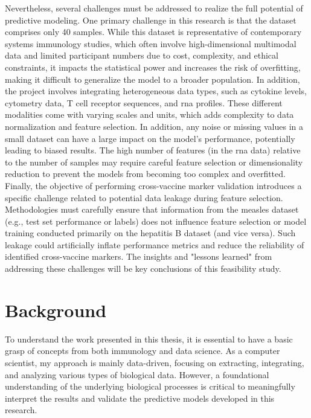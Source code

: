 \documentclass[12pt,a4paper]{report}
\begin{document}
Nevertheless, several challenges must be addressed to realize the full potential of predictive modeling. One primary challenge in this research is that the dataset comprises only 40 samples. While this dataset is representative of contemporary systems immunology studies, which often involve high-dimensional multimodal data and limited participant numbers due to cost, complexity, and ethical constraints, it impacts the statistical power and increases the risk of overfitting, making it difficult to generalize the model to a broader population. In addition, the project involves integrating heterogeneous data types, such as cytokine levels, cytometry data, T cell receptor sequences, and \acrshort{rna} profiles. These different modalities come with varying scales and units, which adds complexity to data normalization and feature selection. In addition, any noise or missing values in a small dataset can have a large impact on the model’s performance, potentially leading to biased results. The high number of features (in the \acrshort{rna} data) relative to the number of samples may require careful feature selection or dimensionality reduction to prevent the models from becoming too complex and overfitted.  Finally, the objective of performing cross-vaccine marker validation introduces a specific challenge related to potential data leakage during feature selection. Methodologies must carefully ensure that information from the measles dataset (e.g., test set performance or labels) does not influence feature selection or model training conducted primarily on the hepatitis B dataset (and vice versa). Such leakage could artificially inflate performance metrics and reduce the reliability of identified cross-vaccine markers. The insights and "lessons learned" from addressing these challenges will be key conclusions of this feasibility study.









\chapter{Background}
\noindent
To understand the work presented in this thesis, it is essential to have a basic grasp of concepts from both immunology and data science. As a computer scientist, my approach is mainly data-driven, focusing on extracting, integrating, and analyzing various types of biological data. However, a foundational understanding of the underlying biological processes is critical to meaningfully interpret the results and validate the predictive models developed in this research.
\end{document}
